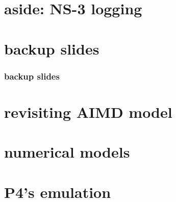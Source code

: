 \section{aside: NS-3 logging}




\section{backup slides}
\begin{frame}\frametitle{backup slides}
\end{frame}


\section{revisiting AIMD model}



\section{numerical models}



\section{P4's emulation}


